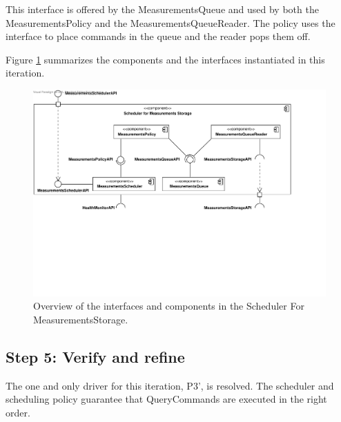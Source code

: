 \npar This interface is offered by the MeasurementsQueue and used by both the
MeasurementsPolicy and the MeasurementsQueueReader. The policy uses the
interface to place commands in the queue and the reader pops them off.

\npar Figure \ref{fig:it3/interfaces} summarizes the components and the
interfaces instantiated in this iteration.

\begin{figure}[H]
	\begin{centering}
		\includegraphics[width=\textwidth]{figs/add-it3-interfaces.pdf}
		\caption{Overview of the interfaces and components in the Scheduler For
		MeasurementsStorage.}
		\label{fig:it3/interfaces}
	\end{centering}
\end{figure}

\subsection{Step 5: Verify and refine}
\label{add:it3/verification}

\npar The one and only driver for this iteration, P3', is resolved. The
scheduler and scheduling policy guarantee that QueryCommands are executed in the
right order.